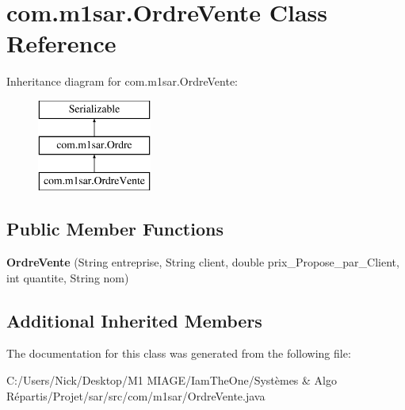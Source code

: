 \hypertarget{classcom_1_1m1sar_1_1_ordre_vente}{}\section{com.\+m1sar.\+Ordre\+Vente Class Reference}
\label{classcom_1_1m1sar_1_1_ordre_vente}
Inheritance diagram for com.\+m1sar.\+Ordre\+Vente\+:\begin{figure}[H]
\begin{center}
\leavevmode
\includegraphics[height=3.000000cm]{classcom_1_1m1sar_1_1_ordre_vente}
\end{center}
\end{figure}
\subsection*{Public Member Functions}
\begin{DoxyCompactItemize}
\item 
\mbox{\label{classcom_1_1m1sar_1_1_ordre_vente_ac6f7721569e4d4bbc186a3dbf4b5bd5b}} 
{\bfseries Ordre\+Vente} (String entreprise, String client, double prix\+\_\+\+Propose\+\_\+par\+\_\+\+Client, int quantite, String nom)
\end{DoxyCompactItemize}
\subsection*{Additional Inherited Members}


The documentation for this class was generated from the following file\+:\begin{DoxyCompactItemize}
\item 
C\+:/\+Users/\+Nick/\+Desktop/\+M1 M\+I\+A\+G\+E/\+Iam\+The\+One/\+Systèmes \& Algo Répartis/\+Projet/sar/src/com/m1sar/Ordre\+Vente.\+java\end{DoxyCompactItemize}
